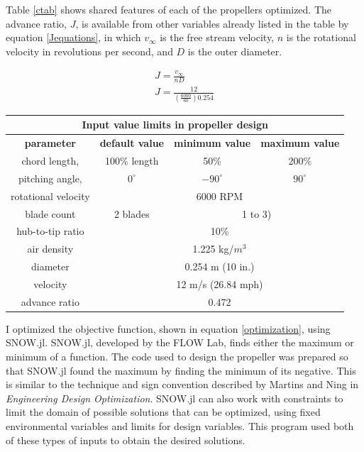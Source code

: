 \documentclass[journal ]{new-aiaa}
\begin{document}
Table \ref{ctab} shows shared features of each of the propellers optimized. The advance ratio, $J$, is available from other variables already listed in the table by equation \ref{Jequations}, in which $v_{\infty}$ is the free stream velocity, $n$ is the rotational velocity in revolutions per second, and $D$ is the outer diameter.

\begin{equation}
	\begin{aligned}
	\label{Jequations}
	J = \frac{v_{\infty}}{n D} \\
	J = \frac{12}{(\frac{6000}{60}) 0.254}
	\end{aligned}
\end{equation}

\begin{center}
\label{ctab}
\begin{tabular}{| c | c | c | c |}
	\multicolumn{4}{c}{\textbf{Input value limits in propeller design}} \\ \hline
  	 \textbf{parameter} & \textbf{default value} & \textbf{minimum value} & \textbf{maximum value} \\ \hline
	 chord length, & 100\% length & 50\% & 200\% \\ \hline
	 pitching angle, & $0^{\circ}$ & $-90^{\circ}$ & $90^{\circ}$ \\ \hline \hline
	 rotational velocity & \multicolumn{3}{c|}{6000 RPM} \\ \hline
	 blade count & 2 blades & \multicolumn{2}{c|}{1 to 3)}\\ \hline
	 hub-to-tip ratio & \multicolumn{3}{c|}{10\%} \\ \hline
	 air density & \multicolumn{3}{c|}{1.225 kg/$m^{3}$} \\ \hline
	 diameter & \multicolumn{3}{c|}{0.254 m (10 in.)} \\ \hline
	 velocity & \multicolumn{3}{c|}{12 m/s (26.84 mph)} \\ \hline
	 advance ratio & \multicolumn{3}{c|}{0.472} \\ \hline
\end{tabular}
\end{center}

I optimized the objective function, shown in equation \ref{optimization}, using SNOW.jl. SNOW.jl, developed by the FLOW Lab, finds either the maximum or minimum of a function. The code used to design the propeller was prepared so that SNOW.jl found the maximum by finding the minimum of its negative. This is similar to the technique and sign convention described by Martins and Ning in \emph{Engineering Design Optimization}\cite{EngDesOpt}. SNOW.jl can also work with constraints to limit the domain of possible solutions that can be optimized, using fixed environmental variables and limits for design variables. This program used both of these types of inputs to obtain the desired solutions.
\end{document}
